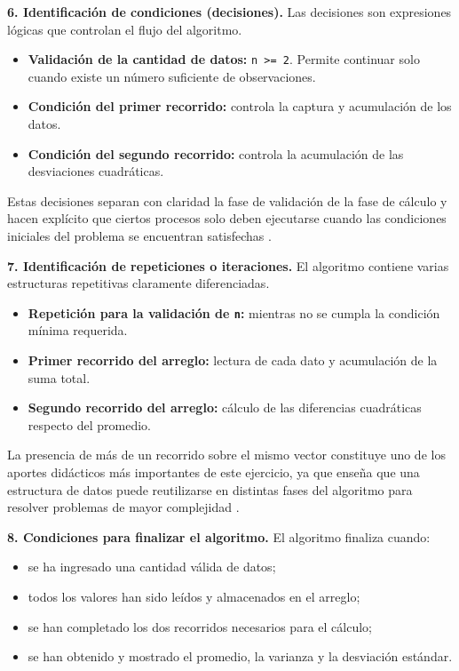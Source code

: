 \documentclass[12pt,twoside]{book}
\begin{document}
					\noindent
					\textbf{6. Identificación de condiciones (decisiones).}
					Las decisiones son expresiones lógicas que controlan el flujo del algoritmo.
					
					\begin{itemize}
						\item \textbf{Validación de la cantidad de datos:} \texttt{n >= 2}. Permite continuar solo cuando existe un número suficiente de observaciones.
						\item \textbf{Condición del primer recorrido:} controla la captura y acumulación de los datos.
						\item \textbf{Condición del segundo recorrido:} controla la acumulación de las desviaciones cuadráticas.
					\end{itemize}
					
					\noindent
					Estas decisiones separan con claridad la fase de validación de la fase de cálculo y hacen explícito que ciertos procesos solo deben ejecutarse cuando las condiciones iniciales del problema se encuentran satisfechas \cite{Sebesta2018Concepts,Farrell2018Programming}.
					
					\noindent
					\textbf{7. Identificación de repeticiones o iteraciones.}
					El algoritmo contiene varias estructuras repetitivas claramente diferenciadas.
					
					\begin{itemize}
						\item \textbf{Repetición para la validación de \texttt{n}:} mientras no se cumpla la condición mínima requerida.
						\item \textbf{Primer recorrido del arreglo:} lectura de cada dato y acumulación de la suma total.
						\item \textbf{Segundo recorrido del arreglo:} cálculo de las diferencias cuadráticas respecto del promedio.
					\end{itemize}
					
					\noindent
					La presencia de más de un recorrido sobre el mismo vector constituye uno de los aportes didácticos más importantes de este ejercicio, ya que enseña que una estructura de datos puede reutilizarse en distintas fases del algoritmo para resolver problemas de mayor complejidad \cite{Qian2018Students,Lister2004Learning,Robins2003Learning}.
					
					\noindent
					\textbf{8. Condiciones para finalizar el algoritmo.}
					El algoritmo finaliza cuando:
					
					\begin{itemize}
						\item se ha ingresado una cantidad válida de datos;
						\item todos los valores han sido leídos y almacenados en el arreglo;
						\item se han completado los dos recorridos necesarios para el cálculo;
						\item se han obtenido y mostrado el promedio, la varianza y la desviación estándar.
					\end{itemize}
					
\end{document}
